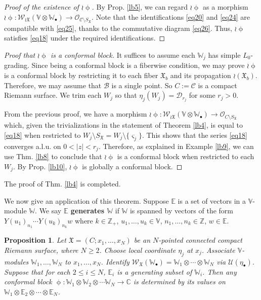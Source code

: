 \documentclass[12pt,a4paper,notitlepage]{article}
\theoremstyle{definition}
\theoremstyle{plain}
\newtheorem{pp}[df]{Proposition}
\newcommand{\fk}{\mathfrak}
\newcommand{\mc}{\mathcal}
\newcommand{\scr}{\mathscr}
\newcommand{\sgm}{\varsigma}
\newcommand{\SX}{{S_{\fk X}}}
\newcommand{\blt}{\bullet}
\newcommand{\Vbb}{\mathbb V}
\newcommand{\Wbb}{\mathbb W}
\newcommand{\Cbb}{\mathbb C}
\newcommand{\Zbb}{\mathbb Z}
\newcommand{\Ebb}{\mathbb E}
\numberwithin{equation}{section}
\begin{document}
\begin{proof}[Proof  of the existence of $\wr\upphi$]
By Prop. \ref{lb5}, we can regard $\wr\upphi$ as a morphism $\wr\upphi:\scr W_{\wr\fk X}(\Vbb\otimes\Wbb_\blt)\rightarrow\scr O_{\mc C\setminus\SX}$. Note that the identifications \eqref{eq20} and \eqref{eq24} are compatible with \eqref{eq25}, thanks to the commutative diagram \eqref{eq26}. Thus, $\wr\upphi$  satisfies \eqref{eq18} under the required identifications.
\end{proof}


\begin{proof}[Proof that $\wr\upphi$ is a conformal block]
It suffices to assume each $\Wbb_j$ has simple $L_0$-grading. Since being a conformal block is a fiberwise condition, we may prove $\wr\upphi$ is a conformal block by restricting it to each fiber $\fk X_b$ and its propagation $\wr(\fk X_b)$. Therefore, we may assume that $\mc B$ is a single point. So $C:=\mc C$ is a compact Riemann surface. We trim each $W_j$ so that $\eta_j(W_j)=\mc D_{r_j}$ for some $r_j>0$.

From the previous proof, we have a morphism $\wr\upphi:\scr W_{\wr\fk X}(\Vbb\otimes\Wbb_\blt)\rightarrow\scr O_{C\setminus\SX}$ which, given the trivializations in the statement of Theorem \ref{lb4}, is equal to \eqref{eq18} when restricted to $W_j\setminus\SX=W_j\setminus\{\sgm_j\}$. This shows that the series \eqref{eq18} converges a.l.u. on $0<|z|<r_j$. Therefore, as explained in Example \ref{lb9}, we can use Thm. \ref{lb8} to conclude that $\wr\upphi$ is a conformal block when restricted to each $W_j$. By Prop. \ref{lb10}, $\wr\upphi$ is globally a conformal block.
\end{proof}


The proof of Thm. \ref{lb4} is completed.

We now give an application of this theorem. Suppose $\Ebb$ is a set of vectors in a $\Vbb$-module $\Wbb$. We say \textbf{$\Ebb$ generates $\Wbb$} if $\Wbb$ is spanned by vectors of the form $Y(u_1)_{n_1}\cdots Y(u_k)_{n_k}w$ where $k\in\Zbb_+$, $u_1,\dots,u_k\in\Vbb$, $n_1,\dots,n_k\in\Zbb$, $w\in\Ebb$. 


\begin{pp}\label{lb12}
Let $\fk X=(C;x_1,\dots,x_N)$ be an $N$-pointed connected compact Riemann surface, where $N\geq 2$. Choose local coordinate $\eta_j$ at $x_j$. Associate $\Vbb$-modules $\Wbb_1,\dots,\Wbb_N$ to $x_1,\dots,x_N$. Identify $\scr W_{\fk X}(\Wbb_\blt)=\Wbb_1\otimes\cdots\otimes\Wbb_N$ via $\mc U(\eta_\blt)$. Suppose that for each $2\leq i\leq N$, $\Ebb_i$ is a generating subset of $\Wbb_i$. Then any conformal block $\upphi:\Wbb_1\otimes\Wbb_2\otimes\cdots\Wbb_N\rightarrow\Cbb$ is determined by its values on $\Wbb_1\otimes\Ebb_2\otimes\cdots\otimes\Ebb_N$.
\end{pp}
\end{document}
